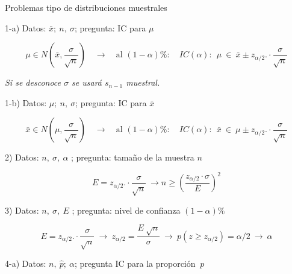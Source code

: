 \begin{myalertblock}{Problemas tipo de distribuciones muestrales}

\vspace{10mm} 

\begin{destacado}
1-a) Datos: $\bar x;\ n,\ \sigma$; pregunta: IC para $\mu$

$$ \mu \in N \left( \bar x , \dfrac{\sigma}{\sqrt{n}} \right) \quad \longrightarrow \quad \text {al } (1-\alpha)\%: \quad IC(\alpha): \ \ \mu \ \in \ \bar x \pm z_{\alpha/2}. \cdot \dfrac{\sigma}{\sqrt{n}} $$

\begin{center} \vspace{2mm}  \textit{Si se desconoce $\sigma$ se usará $s_{n-1}$ muestral.} \end{center}

\vspace{5mm} 1-b) Datos: $\mu;\ n,\ \sigma$; pregunta: IC para $\bar x$

$$ \bar x \in N \left( \mu , \dfrac{\sigma}{\sqrt{n}} \right) \quad \longrightarrow \quad \text {al } (1-\alpha)\%: \quad IC(\alpha): \ \ \bar x \ \in \ \mu \pm z_{\alpha/2}. \cdot \dfrac{\sigma}{\sqrt{n}} $$
\end{destacado}

\vspace{10mm} 
\begin{destacado}
	2) Datos: $ n,\ \sigma,\ \alpha$ ; pregunta: tamaño de la muestra $n$
	
	$$ E= z_{\alpha/2}. \cdot \dfrac{\sigma}{\sqrt{n}} \ \longrightarrow n\ge \left( \dfrac{z_{\alpha/2}\cdot \sigma}{E} \right)^2 $$
\end{destacado}

\vspace{10mm} 
\begin{destacado}
	3) Datos: $ n,\ \sigma,\ E$ ; pregunta: nivel de confianza $(1-\alpha)\%$
	
	$$ E= z_{\alpha/2}. \cdot \dfrac{\sigma}{\sqrt{n}} \ \longrightarrow \ z_{\alpha/2}=\dfrac{E\ \sqrt{n}}{\sigma} \ \longrightarrow \  p(z\ge z_{\alpha/2})=\alpha/2 \ \longrightarrow \ \alpha$$	
\end{destacado}

\vspace{10mm} 
\begin{destacado}
	\vspace{5mm} 4-a) Datos: $ n,\ \widehat p;\ \alpha$; pregunta IC para la proporción $\ p$
	

\end{destacado}
\end{myalertblock}

